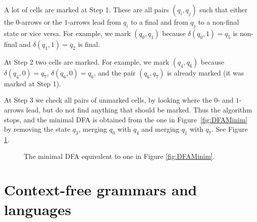 \begin{page}
\begin{exl}
A lot of cells are marked at Step 1.
These are all pairs $(q_i, q_j)$ such that either the $0$-arrows or the $1$-arrows lead from $q_i$ to a final and from $q_j$ to a non-final state or vice versa.
For example, we mark $(q_0, q_1)$ because $\delta(q_0, 1) = q_5$ is non-final and $\delta(q_1, 1) = q_2$ is final.

At Step 2 two cells are marked.
For example, we mark $(q_4, q_6)$ because $\delta(q_4, 0) = q_7$, $\delta(q_6, 0) = q_6$, and the pair $(q_6, q_7)$ is already marked (it was marked at Step 1).

At Step 3 we check all pairs of unmarked cells, by looking where the $0$- and $1$-arrows lead, but do not find anything that should be marked.
Thus the algorithm stops, and the minimal DFA is obtained from the one in Figure~\ref{fig:DFAMinim} by removing the state $q_3$,
merging $q_0$ with $q_4$ and merging $q_1$ with $q_7$. See Figure \ref{fig:DFAMinimResult}.

\begin{figure}[ht]
\begin{center}

\end{center}
\caption{The minimal DFA equivalent to one in Figure \ref{fig:DFAMinim}.}
\label{fig:DFAMinimResult}
\end{figure}
\end{exl}

\end{page}

\begin{page}
\setcounter{section}{5}
\setcounter{subsection}{0}
\setcounter{dfn}{9}
\label{portion:1071}





\newpage


\end{page}

\begin{page}
\setcounter{section}{5}
\setcounter{subsection}{1}
\setcounter{dfn}{0}
\label{portion:1072}

\section{Context-free grammars and languages}

\end{page}


